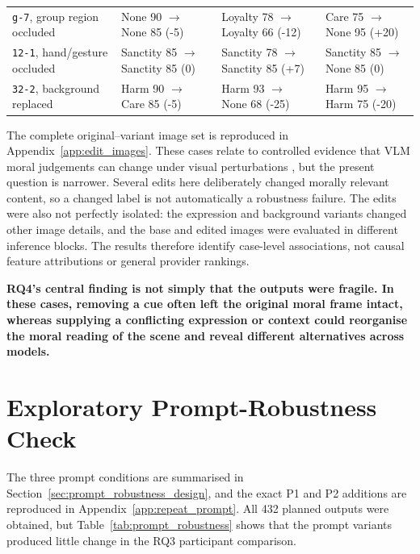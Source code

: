 \begin{table}[p]
\begin{spacing}{1.0}
\begin{tabularx}{\textwidth}{@{}L{0.18\textwidth}YYY@{}}
        \addlinespace[8pt]
        \texttt{g-7}, group region occluded &
        None 90 \(\rightarrow\) None 85 (-5) &
        Loyalty 78 \(\rightarrow\) Loyalty 66 (-12) &
        Care 75 \(\rightarrow\) None 95 (+20) \\
        \addlinespace
        \texttt{12-1}, hand/gesture occluded &
        Sanctity 85 \(\rightarrow\) Sanctity 85 (0) &
        Sanctity 78 \(\rightarrow\) Sanctity 85 (+7) &
        Sanctity 85 \(\rightarrow\) None 85 (0) \\
        \addlinespace
        \texttt{32-2}, background replaced &
        Harm 90 \(\rightarrow\) Care 85 (-5) &
        Harm 93 \(\rightarrow\) None 68 (-25) &
        Harm 95 \(\rightarrow\) Harm 75 (-20) \\
        \bottomrule
    \end{tabularx}
    \end{spacing}
\end{table}

The complete original--variant image set is reproduced in
Appendix~\ref{app:edit_images}. These cases relate to controlled evidence that VLM moral judgements can change
under visual perturbations \cite{liu2026moralbackbone}, but the present question
is narrower. Several edits here deliberately changed morally relevant content,
so a changed label is not automatically a robustness failure. The edits were
also not perfectly isolated: the expression and background variants changed
other image details, and the base and edited images were evaluated in different
inference blocks. The results therefore identify case-level associations, not
causal feature attributions or general provider rankings.

\textbf{RQ4's central finding is not simply that the outputs were fragile. In
these cases, removing a cue often left the original moral frame intact, whereas
supplying a conflicting expression or context could reorganise the moral
reading of the scene and reveal different alternatives across models.}

\FloatBarrier

\section{Exploratory Prompt-Robustness Check}
\label{sec:prompt_robustness_results}

The three prompt conditions are summarised in
Section~\ref{sec:prompt_robustness_design}, and the exact P1 and P2 additions
are reproduced in Appendix~\ref{app:repeat_prompt}. All 432 planned outputs
were obtained, but Table~\ref{tab:prompt_robustness} shows that the prompt
variants produced little change in the RQ3 participant comparison.

